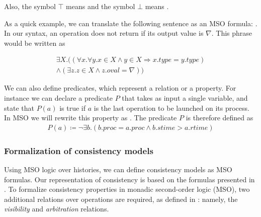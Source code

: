 \documentclass[12pt]{article}
\begin{document}
Also, the symbol $\top$ means  and the symbol $\bot$ means .

As a quick example, we can translate the following sentence as an MSO formula: . In our syntax, an operation does not return if its output value is $\nabla$. This phrase would be written as

\begin{gather*}
\exists X.\Big((\forall x.\forall y.x\in X\land y\in X \Rightarrow x.type=y.type)\\
\land(\exists z.z\in X\land z.oval=\nabla)\Big)
\end{gather*}

We can also define predicates, which represent a relation or a property. For instance we can declare a predicate $P$ that takes as input a single variable, and state that $P(a)$ is true if $a$ is the last operation to be launched on its process. In MSO we will rewrite this property as . The predicate $P$ is therefore defined as
\vspace{0.4em}
\begin{gather*}
P(a)\coloneq\neg\exists b.(b.proc=a.proc\land b.stime>a.rtime)
\end{gather*}

\subsubsection{Formalization of consistency models}

Using MSO logic over histories, we can define consistency models as MSO formulas. Our representation of consistency is based on the formulas presented in \cite{ViottiVukolic}. To formalize consistency properties in monadic second-order logic (MSO), two additional relations over operations are required, as defined in \cite{PrinciplesOfEventualConsistency}: namely, the \textsl{visibility} and \textsl{arbitration} relations.

\vspace{2em}
\end{document}
